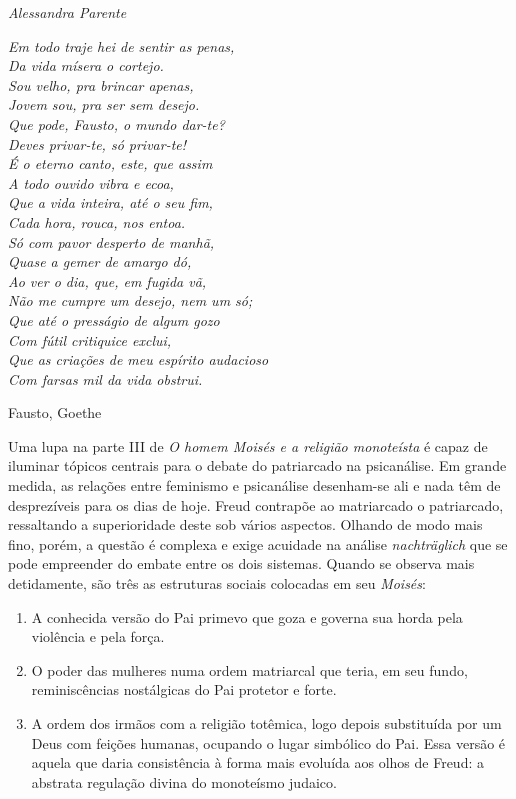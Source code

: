 \begin{flushright}
\emph{Alessandra Parente}
\end{flushright}

\epigraph{\emph{Em todo traje hei de sentir as penas,\\
Da vida mísera o cortejo.\\
Sou velho, pra brincar apenas,\\
Jovem sou, pra ser sem desejo.\\
Que pode, Fausto, o mundo dar-te?\\
Deves privar-te, só privar-te!\\
É o eterno canto, este, que assim\\
A todo ouvido vibra e ecoa,\\
Que a vida inteira, até o seu fim,\\
Cada hora, rouca, nos entoa.\\
Só com pavor desperto de manhã,\\
Quase a gemer de amargo dó,\\
Ao ver o dia, que, em fugida vã,\\
Não me cumpre um desejo, nem um só;\\
Que até o presságio de algum gozo\\
Com fútil critiquice exclui,\\
Que as criações de meu espírito audacioso\\
Com farsas mil da vida obstrui.}}{Fausto, Goethe}

Uma lupa na parte III de \emph{O homem Moisés e a religião monoteísta} é
capaz de iluminar tópicos centrais para o debate do patriarcado na
psicanálise. Em grande medida, as relações entre feminismo e psicanálise
desenham-se ali e nada têm de desprezíveis para os dias de hoje. Freud
contrapõe ao matriarcado o patriarcado, ressaltando a superioridade
deste sob vários aspectos. Olhando de modo mais fino, porém, a questão é
complexa e exige acuidade na análise \emph{nachträglich} que se pode
empreender do embate entre os dois sistemas. Quando se observa mais
detidamente, são três as estruturas sociais colocadas em seu
\emph{Moisés}:

\begin{enumerate}
\def\labelenumi{\arabic{enumi})}
\item
  A conhecida versão do Pai primevo que goza e governa sua horda pela
  violência e pela força.
\item
  O poder das mulheres numa ordem matriarcal que teria, em seu fundo,
  reminiscências nostálgicas do Pai protetor e forte.
\item
  A ordem dos irmãos com a religião totêmica, logo depois substituída
  por um Deus com feições humanas, ocupando o lugar simbólico do Pai.
  Essa versão é aquela que daria consistência à forma mais evoluída aos
  olhos de Freud: a abstrata regulação divina do monoteísmo judaico.
\end{enumerate}

